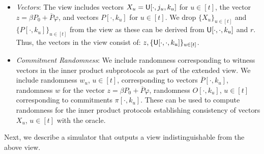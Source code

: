 \begin{itemize}[\leftmargin=0pt]
\item {\em Vectors}: The view includes vectors
$X_u=\mathsf{U}[\cdot,j_u,k_u]$ for $u\in [t]$, the vector $z = \beta P_0 +
\overline{P} \varphi$,  and vectors $P[\cdot, k_u]$ for $u\in [t]$.  We drop
$\{X_u\}_{u\in [t]}$ and $\{P[\cdot,k_u]\}_{u\in [t]}$ from the view as these
can be derived from $\mathsf{U}[\cdot,\cdot,k_u]$ and $r$. Thus, the vectors in the
view consist of: $z,\{\mathsf{U}[\cdot,\cdot,k_u]\}_{u\in [t]}$.

\item {\em Commitment Randomness}: We include randomness corresponding to
witness vectors in the inner product subprotocols as part of the extended view.
We include randomness $w_u$, $u\in
[t]$, corresponding to vectors $\overline{P}[\cdot,k_u]$, 
randomness $w$ for the vector $z=\beta P_0 +
\overline{P}\varphi$, randomness $O[\cdot,k_u]$, $u\in [t]$ 
corresponding to commitments $\pi[\cdot,k_u]$. These can be used to compute
randomness for the inner product protocols establishing consistency of vectors
$X_u$, $u\in [t]$ with the oracle.
\end{itemize}
Next, we describe a simulator that outputs a view indistinguishable from the
above view.

